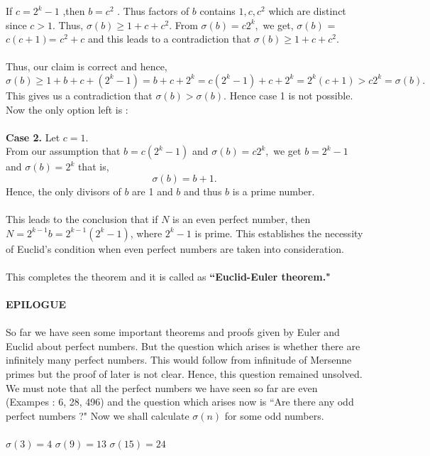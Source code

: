 \documentclass[a4paper,11pt]{article}
\begin{document}
If $c = 2^k-1$ ,then $b=c^2$ . Thus factors of $b$ contains $1,c,c^2$ which are distinct since $c > 1$. Thus,
$\sigma(b) \geq 1+c+c^2$. From $\sigma(b)= c2^k,$ we get, $\sigma(b)$ = $c(c+1)$= $c^2 + c$ and this leads to a contradiction that $\sigma(b) \geq 1+c+c^2$.\\
\\
Thus, our claim is correct and hence,\\
$\sigma(b) \geq 1 + b + c + (2^k-1) = b + c + 2^k = c(2^k-1) + c + 2^k 
= 2^k(c+1)>c2^k = \sigma(b). $ \\
This gives us a contradiction that $\sigma(b) > \sigma(b).$ Hence case 1 is not possible. Now the only option left is :\\
\\
\textbf{Case 2.} Let $c=1$.\\
From our assumption that $b = c(2^k-1)$ and $\sigma(b) = c2^k,$ we get $b = 2^k-1 $ and $\sigma(b) = 2^k$ that is, \\
$$\sigma(b) = b + 1.$$
Hence, the only divisors of $b$ are 1 and $b$ and thus $b$ is a prime number.\\
\\
This leads to the conclusion that if $N$ is an even perfect number, then 
$N = 2^{k- 1} b = 2^{k-1} (2^k-1)$, where $2^k - 1$ is prime. This establishes the necessity of Euclid's condition when even perfect numbers are taken into consideration.\\
\\
This completes the theorem and it is called as \textbf{``Euclid-Euler theorem."}\\
\\
\textbf{EPILOGUE}\\
\\
So far we have seen some important theorems and proofs given by Euler and Euclid about perfect numbers. But the question which arises is whether there are infinitely many perfect numbers. This would follow from infinitude of Mersenne primes but the proof of later is not clear. Hence, this question remained unsolved.\\
We must note that all the perfect numbers we have seen so far are even (Exampes : 6, 28, 496) and the question which arises now is ``Are there any odd perfect numbers ?" Now we shall calculate $\sigma(n)$ for some odd numbers.\\
\\
$\sigma(3) = 4$ \hspace{1cm} $\sigma(9) = 13$ \hspace{1.1cm}   $\sigma(15) = 24$\\
\end{document}
